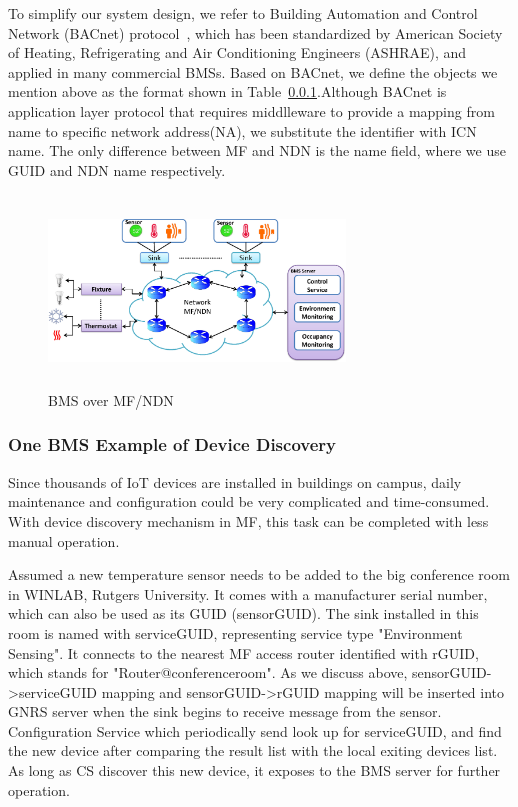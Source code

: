 To simplify our system design, we refer to Building Automation and Control Network (BACnet) protocol~\cite{}, which has been standardized by  American Society of Heating, Refrigerating and Air Conditioning Engineers (ASHRAE), and applied in many commercial BMSs. Based on BACnet, we define the objects we mention above as the format shown in Table~\ref{}.Although BACnet is application layer protocol that requires middlleware to provide a mapping from name to specific network address(NA), we substitute the identifier with ICN name. The only difference between MF and NDN is the name field, where we use GUID and NDN name respectively. 
\begin{table}
\label{tab:bac_object}
\end{table}
\begin{figure}
\includegraphics[width=3.1in,height=2.00in]{bms_arch.eps}
\caption{BMS over MF/NDN}
\label{fig:bms_arch}
\end{figure}
\subsubsection{One BMS Example of Device Discovery}
Since thousands of IoT devices are installed in buildings on campus, daily maintenance and configuration could be very complicated and time-consumed. With device discovery mechanism in MF, this task can be completed with less manual operation.

Assumed a new temperature sensor needs to be added to the big conference room in WINLAB, Rutgers University. It comes with a manufacturer serial number, which can also be used as its GUID (sensorGUID). The sink installed in this room is named with serviceGUID, representing service type "Environment Sensing". It connects to the nearest MF access router identified with rGUID, which stands for "Router@conferenceroom". As we discuss above, sensorGUID->serviceGUID mapping and sensorGUID->rGUID mapping will be inserted into GNRS server when the sink begins to receive message from the sensor. Configuration Service which periodically send look up for serviceGUID, and find the new device after comparing the result list with the local exiting devices list. As long as CS discover this new device, it exposes to the BMS server for further operation.
 

